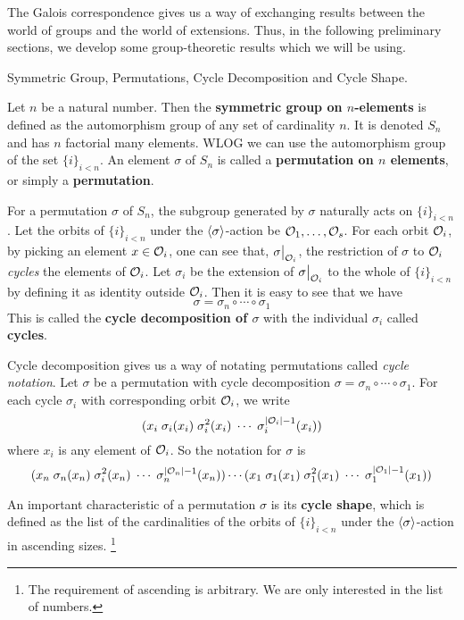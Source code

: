 \documentclass[../../book.tex]{subfiles}
\begin{document}
The Galois correspondence gives us a way of exchanging results
between the world of groups and the world of extensions. 
Thus, in the following preliminary sections, 
we develop some group-theoretic results which we will be using. 

\begin{dfn} Symmetric Group, Permutations, Cycle Decomposition and Cycle Shape.
    
    Let $n$ be a natural number. 
    Then the \textbf{symmetric group on $n$-elements} is defined as
    the automorphism group of any set of cardinality $n$. 
    It is denoted $S_n$ and has $n$ factorial many elements. 
    WLOG we can use the automorphism group of the set $\{i\}_{i<n}$.
    An element $\sigma$ of $S_n$ is called a \textbf{permutation on $n$ elements},
    or simply a \textbf{permutation}. 
    
    For a permutation $\sigma$ of $S_n$, 
    the subgroup generated by $\sigma$ naturally acts on $\{i\}_{i<n}$. 
    Let the orbits of $\{i\}_{i<n}$ under the $\langle\sigma\rangle$-action 
    be $\mathcal{O}_1,\dots,\mathcal{O}_s$. 
    For each orbit $\mathcal{O}_i$, by picking an element $x \in \mathcal{O}_i$, 
    one can see that, $\res{\sigma}{\O_i}$, 
    the restriction of $\sigma$ to $\mathcal{O}_i$ \emph{cycles} the elements of $\mathcal{O}_i$. 
    Let $\sigma_i$ be the extension
    of $\res{\sigma}{\O_i}$ to the whole of $\{i\}_{i<n}$
    by defining it as identity outside $\mathcal{O}_i$. 
    Then it is easy to see that we have \[
        \sigma = \sigma_n \circ \cdots \circ \sigma_1
    \]
    This is called the \textbf{cycle decomposition of $\sigma$}
    with the individual $\sigma_i$ called \textbf{cycles}. 
    
    Cycle decomposition gives us a way of notating permutations 
    called \emph{cycle notation}.
    Let $\sigma$ be a permutation with cycle decomposition 
    $\sigma = \sigma_n \circ \cdots \circ \sigma_1$. 
    For each cycle $\sigma_i$ with corresponding orbit $\mathcal{O}_i$,
    we write \[
        ( x_i \thickspace \sigma_i(x_i) \thickspace \sigma_i^2(x_i) 
        \thickspace \cdots \thickspace \sigma_i^{|\mathcal{O}_i| - 1}(x_i))
    \]
    where $x_i$ is any element of $\mathcal{O}_i$. 
    So the notation for $\sigma$ is \[
        ( x_n \thickspace \sigma_n(x_n) \thickspace \sigma_i^2(x_n) 
        \thickspace \cdots \thickspace \sigma_n^{|\mathcal{O}_n| - 1}(x_n))
        \cdots 
        ( x_1 \thickspace \sigma_1(x_1) \thickspace \sigma_1^2(x_1) 
        \thickspace \cdots \thickspace \sigma_1^{|\mathcal{O}_1| - 1}(x_1))
    \]
    
    An important characteristic of a permutation $\sigma$ is 
    its \textbf{cycle shape}, which is defined as 
    the list of the cardinalities of the orbits of $\{i\}_{i<n}$ 
    under the $\langle\sigma\rangle$-action in ascending sizes. 
    \footnote{
        The requirement of ascending is arbitrary. 
        We are only interested in the list of numbers. 
    }
    
\end{dfn}
\end{document}

